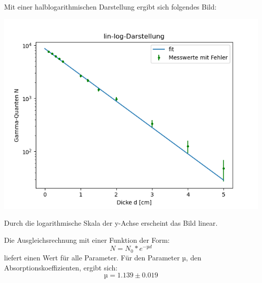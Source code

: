 \documentclass[titlepage=firstcover, captions=tableheading]{scrartcl}
\begin{document}
\noindent Mit einer halblogarithmischen Darstellung ergibt sich folgendes Bild:

\includegraphics{4.png}

\noindent Durch die logarithmische Skala der y-Achse erscheint das Bild linear.

\noindent Die Ausgleichsrechnung mit einer Funktion der Form:
\begin{displaymath}
    N= N_0*e^{-µd}
\end{displaymath}
liefert einen Wert für alle Parameter.
Für den Parameter µ, den Absorptionskoeffizienten, ergibt sich:
\begin{displaymath}
    µ=1.139\pm0.019
\end{displaymath}
\end{document}

